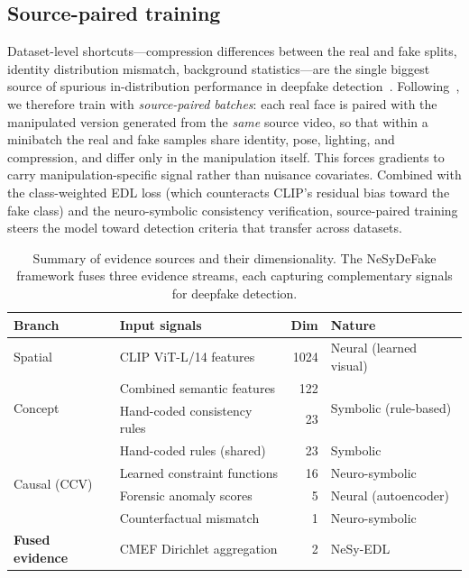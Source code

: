 \documentclass{article}
\begin{document}
\subsection{Source-paired training}
\label{sec:paired}

Dataset-level shortcuts---compression differences between the real and fake splits, identity distribution mismatch, background statistics---are the single biggest source of spurious in-distribution performance in deepfake detection~\citep{yan2023deepfakebench,gend}. Following~\citet{gend}, we therefore train with \emph{source-paired batches}: each real face is paired with the manipulated version generated from the \emph{same} source video, so that within a minibatch the real and fake samples share identity, pose, lighting, and compression, and differ only in the manipulation itself. This forces gradients to carry manipulation-specific signal rather than nuisance covariates. Combined with the class-weighted EDL loss (which counteracts CLIP's residual bias toward the fake class) and the neuro-symbolic consistency verification, source-paired training steers the model toward detection criteria that transfer across datasets.

\begin{table}[t]
  \caption{Summary of evidence sources and their dimensionality. The NeSyDeFake framework fuses three evidence streams, each capturing complementary signals for deepfake detection.}
  \label{tab:evidence_summary}
  \centering
  \small
  \begin{tabular}{llrl}
    \toprule
    \textbf{Branch} & \textbf{Input signals} & \textbf{Dim} & \textbf{Nature} \\
    \midrule
    Spatial & CLIP ViT-L/14 features & 1024 & Neural (learned visual) \\
    \midrule
    \multirow{2}{*}{Concept} & Combined semantic features & 122 & \multirow{2}{*}{Symbolic (rule-based)} \\
     & Hand-coded consistency rules & 23 & \\
    \midrule
    \multirow{4}{*}{Causal (CCV)} & Hand-coded rules (shared) & 23 & Symbolic \\
     & Learned constraint functions & 16 & Neuro-symbolic \\
     & Forensic anomaly scores & 5 & Neural (autoencoder) \\
     & Counterfactual mismatch & 1 & Neuro-symbolic \\
    \midrule
    \textbf{Fused evidence} & CMEF Dirichlet aggregation & 2 & NeSy-EDL \\
    \bottomrule
  \end{tabular}
\end{table}
\end{document}
